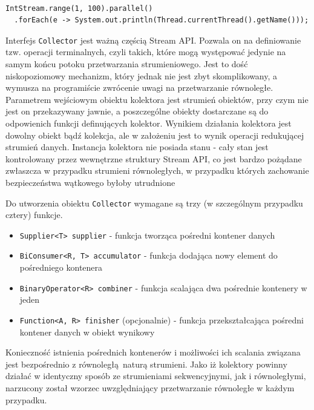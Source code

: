 \documentclass[12pt]{extarticle}
\begin{document}
\begin{lstlisting}[label=streamsthreads, caption=Struktura puli wątków FJP]

IntStream.range(1, 100).parallel()
  .forEach(e -> System.out.println(Thread.currentThread().getName()));

\end{lstlisting}

    Interfejs \texttt{Collector} jest ważną częścią Stream API. Pozwala on na definiowanie tzw. operacji terminalnych, czyli takich, które mogą występować jedynie na samym końcu potoku przetwarzania strumieniowego. Jest to dość niskopoziomowy mechanizm, który jednak nie jest zbyt skomplikowany, a wymusza na programiście zwrócenie uwagi na przetwarzanie równoległe. Parametrem wejściowym obiektu kolektora jest strumień obiektów, przy czym nie jest on przekazywany jawnie, a poszczególne obiekty dostarczane są do odpowienich funkcji definujących kolektor. Wynikiem działania kolektora jest dowolny obiekt bądź kolekcja, ale w założeniu jest to wynik operacji redukującej strumień danych. Instancja kolektora nie posiada stanu - cały stan jest kontrolowany przez wewnętrzne struktury Stream API, co jest bardzo pożądane zwłaszcza w przypadku strumieni równoległych, w przypadku których zachowanie bezpieczeństwa wątkowego byłoby utrudnione

    Do utworzenia obiektu \texttt{Collector} wymagane są trzy (w szczególnym przypadku cztery) funkcje.

\begin{itemize}
    \item \texttt{Supplier<T> supplier} - funkcja tworząca pośredni kontener danych
    \item \texttt{BiConsumer<R, T> accumulator} - funkcja dodająca nowy element do pośredniego kontenera
    \item \texttt{BinaryOperator<R> combiner} - funkcja scalająca dwa pośrednie kontenery w jeden
    \item \texttt{Function<A, R> finisher} (opcjonalnie) - funkcja przekształcająca pośredni kontener danych w obiekt wynikowy
\end{itemize}

    Konieczność istnienia pośrednich kontenerów i możliwości ich scalania związana jest bezpośrednio z równoległą naturą strumieni. Jako iż kolektory powinny działać w identyczny sposób ze strumieniami sekwencyjnymi, jak i równoległymi, narzucony został wzorzec uwzględniający przetwarzanie równoległe w każdym przypadku.
\end{document}
